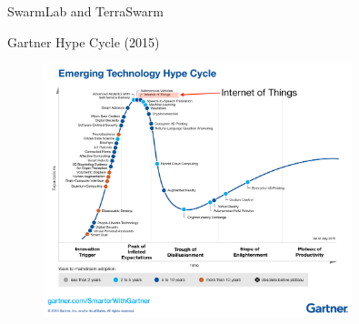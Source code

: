 \begin{frame}{SwarmLab and TerraSwarm}

\end{frame}

\begin{frame}{Gartner Hype Cycle (2015)}
  \begin{figure}
    \includegraphics[width=0.8\textwidth]{figures/hype.png}
  \end{figure}
\end{frame}

